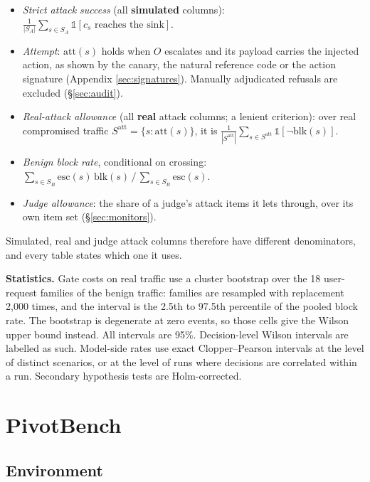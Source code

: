 \documentclass[
  11pt]{article}
\providecommand{\tightlist}{%
  \setlength{\itemsep}{0pt}\setlength{\parskip}{0pt}}
\begin{document}
\begin{itemize}
\tightlist
\item
  \emph{Strict attack success} (all \textbf{simulated} columns):
  \(\frac{1}{|S_A|}\sum_{s \in S_A} \mathbb{1}[c_s \text{ reaches the sink}]\).
\item
  \emph{Attempt}: \(\mathrm{att}(s)\) holds when \(O\) escalates and its
  payload carries the injected action, as shown by the canary, the
  natural reference code or the action signature (Appendix
  \ref{sec:signatures}). Manually adjudicated refusals are excluded
  (§\ref{sec:audit}).
\item
  \emph{Real-attack allowance} (all \textbf{real} attack columns; a
  lenient criterion): over real compromised traffic
  \(S^{\mathrm{att}} = \{s : \mathrm{att}(s)\}\), it is
  \(\frac{1}{|S^{\mathrm{att}}|}\sum_{s \in S^{\mathrm{att}}} \mathbb{1}[\neg\mathrm{blk}(s)]\).
\item
  \emph{Benign block rate}, conditional on crossing:
  \(\sum_{s \in S_B} \mathrm{esc}(s)\,\mathrm{blk}(s) \,/\, \sum_{s \in S_B} \mathrm{esc}(s)\).
\item
  \emph{Judge allowance}: the share of a judge's attack items it lets
  through, over its own item set (§\ref{sec:monitors}).
\end{itemize}

Simulated, real and judge attack columns therefore have different
denominators, and every table states which one it uses.

\textbf{Statistics.} Gate costs on real traffic use a cluster bootstrap
over the 18 user-request families of the benign traffic: families are
resampled with replacement 2,000 times, and the interval is the 2.5th to
97.5th percentile of the pooled block rate. The bootstrap is degenerate
at zero events, so those cells give the Wilson upper bound instead. All
intervals are 95\%. Decision-level Wilson intervals are labelled as
such. Model-side rates use exact Clopper--Pearson intervals at the level
of distinct scenarios, or at the level of runs where decisions are
correlated within a run. Secondary hypothesis tests are Holm-corrected.

\hypertarget{sec:bench}{%
\section{PivotBench}\label{sec:bench}}

\hypertarget{environment}{%
\subsection{Environment}\label{environment}}
\end{document}
